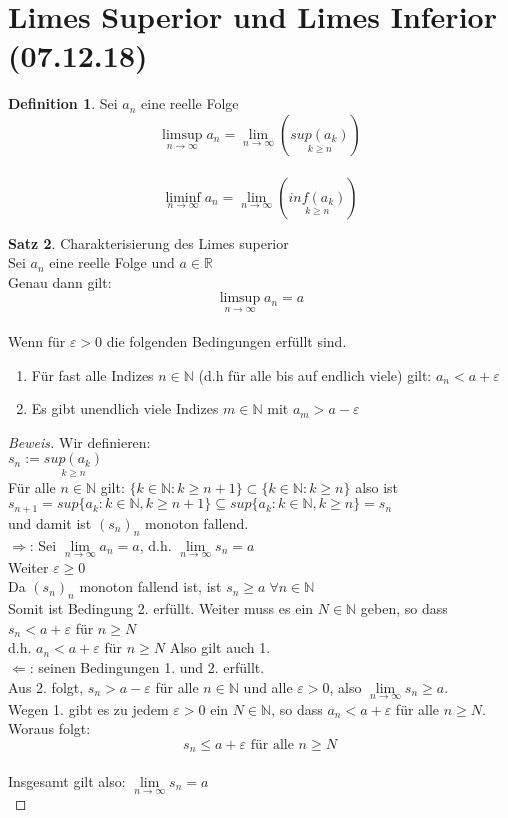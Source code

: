 \documentclass[12pt,a4paper,titlepage]{article} %
\theoremstyle{definition}
\newtheorem{satz}{Satz}[subsection]
\newtheorem{defi}[satz]{Definition}
\theoremstyle{remark}
\newenvironment{bew}{\begin{proof}[Beweis]}{\end{proof}}
\newcommand{\N}{\mathbb{N}}
\newcommand{\R}{\mathbb{R}}
\newcommand{\limes}[1]{\lim\limits_{#1\rightarrow\infty}}
\newcommand{\limessup}[1]{\limsup \limits_{#1\rightarrow\infty}}
\newcommand{\limesinf}[1]{\liminf \limits_{#1\rightarrow\infty}}
\begin{document}
	\section{Limes Superior und Limes Inferior (07.12.18)}
	\begin{defi}
		Sei \(a_n\) eine reelle Folge\\
		\[\limessup{n} a_n = \limes{n} (\underset{k \geq n}{sup(a_k)}) \]\\
		\[\limesinf{n} a_n = \limes{n} (\underset{k \geq n}{inf(a_k)}) \]
	\end{defi}
	\begin{satz}
		Charakterisierung des Limes superior\\
		Sei \(a_n\) eine reelle Folge und \(a \in \R\)\\
		Genau dann gilt:\\
		\[\limessup{n} a_n = a\]\\
		Wenn für \(\varepsilon > 0\) die folgenden Bedingungen erfüllt sind.\\
		\begin{enumerate}
			\item Für fast alle Indizes \(n \in \N\) (d.h für alle bis auf endlich viele) gilt: \(a_n < a+ \varepsilon\)
			\item Es gibt unendlich viele Indizes \(m \in \N\) mit \(a_m > a - \varepsilon\)
		\end{enumerate}
	\end{satz}
	\begin{bew}
		Wir definieren:\\
		\(s_n := \underset{k \geq n}{sup(a_k)}\)\\
		Für alle \(n \in \N\) gilt: \(\{k \in \N: k \geq n+1\} \subset \{k \in \N: k \geq n\}\) also ist\\
		\(s_{n+1} = sup\{a_k: k \in \N, k \geq n+1\} \subseteq sup\{a_k: k \in \N, k \geq n\} = s_n\)\\
		und damit ist \((s_n)_n\) monoton fallend.\\
		\(\Rightarrow\): Sei \(\limes{n} a_n = a\), d.h. \(\limes{n} s_n = a\)\\
		Weiter \(\varepsilon \geq 0\)\\
		Da \((s_n)_n\) monoton fallend ist, ist \(s_n \geq a \; \forall n \in \N\)\\
		Somit ist Bedingung 2. erfüllt. Weiter muss es ein \(N \in \N\) geben, so dass \(s_n < a + \varepsilon\) für \(n \geq N\)\\
		d.h. \(a_n < a + \varepsilon\) für \(n \geq N\) Also gilt auch 1.\\
		\(\Leftarrow\): seinen Bedingungen 1. und 2. erfüllt.\\
		Aus 2. folgt, \(s_n > a - \varepsilon\) für alle \(n \in \N\) und alle \(\varepsilon > 0\), also \(\limes{n} s_n \geq a\).\\
		Wegen 1. gibt es zu jedem \(\varepsilon > 0\) ein \(N \in \N\), so dass \(a_n < a + \varepsilon\) für alle \(n \geq N\).\\
		Woraus folgt:\\
		\[s_n \leq a + \varepsilon \text{ für alle } n \geq N\]\\
		Insgesamt gilt also: \(\limes{n} s_n = a\)\\
	\end{bew}
\end{document}
